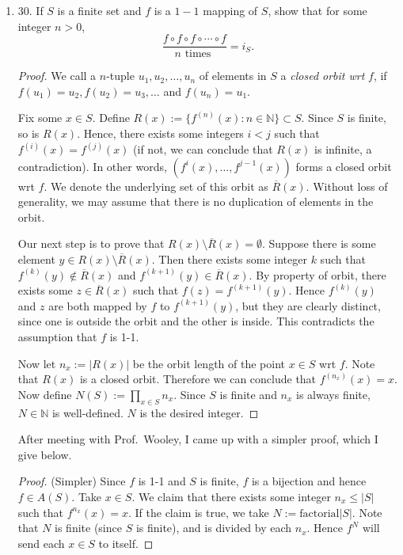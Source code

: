 \begin{enumerate}
\begin{proof}
	Now we show that there is a  bijection between $T^2$ and $T $.
	We use the standard bijection $\langle\cdot, \cdot\rangle: T^{2} \rightarrow T$ defined by $\langle x, y\rangle:=\frac{(x+y-2) \cdot(x+y-1)}{2}+x$. 
	Combine $\langle\cdot, \cdot\rangle$ and $\mu$ and we have a bijection between $S $ and $T $.
\end{proof}
	\item 30. If $S$ is a finite set and $f$ is a $1-1$ mapping of $S$, show that for some integer $n>0$,
\[
\frac{f \circ f \circ f \circ \cdots \circ f}{n \text { times }}=i_{S} . 
\]
\begin{proof}
	We call a $n$-tuple $u_1,u_2,\ldots,u_n$ of elements in $S$ a \textit{closed orbit wrt } $f$, if $f(u_1)=u_2,f(u_2)=u_3,\ldots$ and $f(u_n) = u_1$.
	
Fix some $x \in S$. Define $R(x):=\{f^{(n)}(x):n \in  \mathbb{N}\} \subset S$. Since $S$ is finite, so is $R(x)$. Hence, there exists some integers $i<j$ such that $f^{(i)}(x) = f^{(j)}(x)$ (if not, we can conclude that $R(x)$ is infinite, a contradiction). In other words, $\left( f^{i}(x), \ldots,f^{j-1}(x) \right) $ forms a closed orbit wrt $f $. We denote the underlying set of this orbit as $\overline{R}(x)$. Without loss of generality, we may assume that there is no duplication of elements in the orbit.

Our next step is to prove that $R(x)\setminus \overline{R}(x) = \emptyset$. Suppose there is some element $y \in  R(x) \setminus \overline{R}(x)$. Then there exists some integer $k$ such that $f^{(k)}(y) \not\in \overline{R}(x)$ and $f^{(k+1)}(y) \in \overline{R}(x)$. By property of orbit, there exists some $z \in \overline{R}(x)$ such that $f(z) =  f^{(k+1)}(y)$. Hence $f^{(k)}(y)$ and $z$ are both mapped by $f $ to $f^{(k+1)}(y)$, but they are clearly distinct, since one is outside the orbit and the other is inside. This contradicts the assumption that $f$ is 1-1.

Now let $n_x := |R(x)|$ be the orbit length of the point $x \in S$ wrt $f$. Note that $R(x)$ is a closed orbit. Therefore we can conclude that $f^{(n_x)}(x) = x$. Now define $N(S):=\prod_{x \in S } n_x $. Since $S$ is finite and $n_x$ is always finite, $N \in \mathbb{N}$ is well-defined. $N $ is the desired integer. 
\end{proof}

After meeting with Prof.~Wooley, I came up with a simpler proof, which I give below.

\begin{proof}
	(Simpler) Since $f$ is 1-1 and $S$ is finite, $f$ is a bijection and hence $f \in A(S)$. Take $x \in S$. We claim that there exists some integer $n_x \le |S|$ such that $f^{n_x}(x) = x$. If the claim is true, we take $N:= \text{factorial} |S|$. Note that $N$ is finite (since $S $ is finite), and is divided by each $n_x$. Hence $f^N$ will send each $x \in S $ to itself.


\end{proof}
\end{enumerate}
